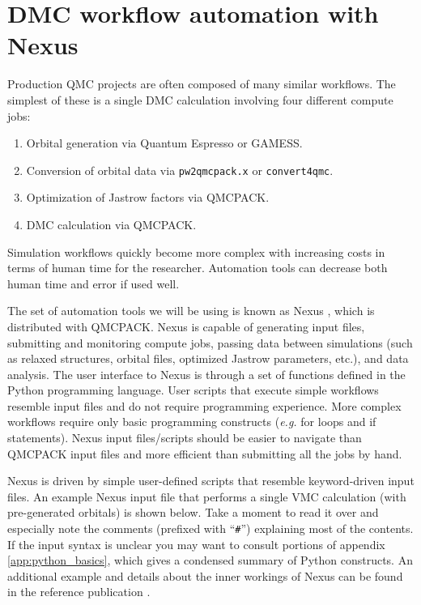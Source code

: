 \section{DMC workflow automation with Nexus}
Production QMC projects are often composed of many similar workflows.  The simplest of these is a single DMC calculation involving four different compute jobs:
\begin{enumerate}
  \item{Orbital generation via Quantum Espresso or GAMESS.}
  \item{Conversion of orbital data via \texttt{pw2qmcpack.x} or \texttt{convert4qmc}.}
  \item{Optimization of Jastrow factors via QMCPACK.}
  \item{DMC calculation via QMCPACK.}
\end{enumerate}
Simulation workflows quickly become more complex with increasing costs in terms of human time for the researcher.  Automation tools can decrease both human time and error if used well.

The set of automation tools we will be using is known as Nexus \cite{Krogel2016nexus}, which is distributed with QMCPACK.  Nexus is capable of generating input files, submitting and monitoring compute jobs, passing data between simulations (such as relaxed structures, orbital files, optimized Jastrow parameters, etc.), and data analysis.  The user interface to Nexus is through a set of functions defined in the Python programming language.  User scripts that execute simple workflows resemble input files and do not require programming experience.  More complex workflows require only basic programming constructs (\emph{e.g.} for loops and if statements).  Nexus input files/scripts should be easier to navigate than QMCPACK input files and more efficient than submitting all the jobs by hand.

Nexus is driven by simple user-defined scripts that resemble keyword-driven input files.  An example Nexus input file that performs a single VMC calculation (with pre-generated orbitals) is shown below.  Take a moment to read it over and especially note the comments (prefixed with ``\texttt{\#}'') explaining most of the contents.  If the input syntax is unclear you may want to consult portions of appendix \ref{app:python_basics}, which gives a condensed summary of Python constructs.  An additional example and details about the inner workings of Nexus can be found in the reference publication \cite{Krogel2016nexus}. 

